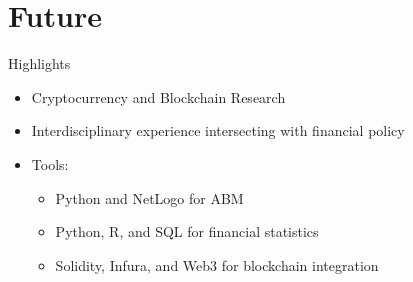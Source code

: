 \documentclass{beamer}
\begin{document}
\section{Future}

\begin{frame}{Highlights}
\begin{itemize}
\item Cryptocurrency and Blockchain Research
\item Interdisciplinary experience intersecting with financial policy
\item Tools: 
\begin{itemize}
    \item Python and NetLogo for ABM
    \item Python, R, and SQL for financial statistics
    \item Solidity, Infura, and Web3 for blockchain integration
\end{itemize}
\end{itemize}
\end{frame}




\end{document}
